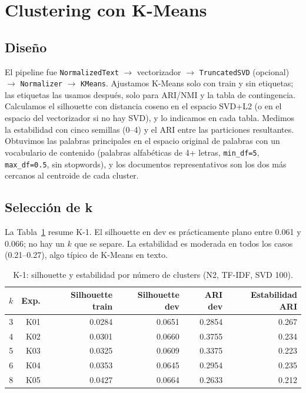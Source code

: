 \documentclass[11pt,a4paper]{article}
\newcommand{\code}[1]{\texttt{#1}}
\begin{document}
\section{Clustering con K-Means}

\subsection{Diseño}
El pipeline fue \code{NormalizedText} $\rightarrow$ vectorizador $\rightarrow$
\code{TruncatedSVD} (opcional) $\rightarrow$ \code{Normalizer} $\rightarrow$ \code{KMeans}.
Ajustamos K-Means solo con train y sin etiquetas; las etiquetas las usamos después, solo
para ARI/NMI y la tabla de contingencia. Calculamos el silhouette con distancia coseno en
el espacio SVD+L2 (o en el espacio del vectorizador si no hay SVD), y lo indicamos en cada
tabla. Medimos la estabilidad con cinco semillas (0--4) y el ARI entre las particiones
resultantes. Obtuvimos las palabras principales en el espacio original de palabras con
un vocabulario de contenido (palabras alfabéticas de 4+ letras, \code{min\_df=5},
\code{max\_df=0.5}, sin stopwords), y los documentos representativos son los dos más
cercanos al centroide de cada cluster.

\subsection{Selección de k}
La Tabla~\ref{tab:k1} resume K-1. El silhouette en dev es prácticamente plano entre 0.061
y 0.066; no hay un $k$ que se separe. La estabilidad es moderada en todos los casos
(0.21--0.27), algo típico de K-Means en texto.

\begin{table}[htbp]
\centering
\small
\caption{K-1: silhouette y estabilidad por número de clusters (N2, TF-IDF, SVD 100).}
\label{tab:k1}
\begin{tabular}{@{}rrrrrr@{}}
\toprule
$k$ & Exp. & Silhouette train & Silhouette dev & ARI dev & Estabilidad ARI\\
\midrule
3 & K01 & 0.0284 & 0.0651 & 0.2854 & 0.267\\
4 & K02 & 0.0301 & 0.0660 & 0.3755 & 0.234\\
5 & K03 & 0.0325 & 0.0609 & 0.3375 & 0.223\\
6 & K04 & 0.0353 & 0.0645 & 0.2954 & 0.235\\
8 & K05 & 0.0427 & 0.0664 & 0.2633 & 0.212\\
\bottomrule
\end{tabular}
\end{table}
\end{document}
